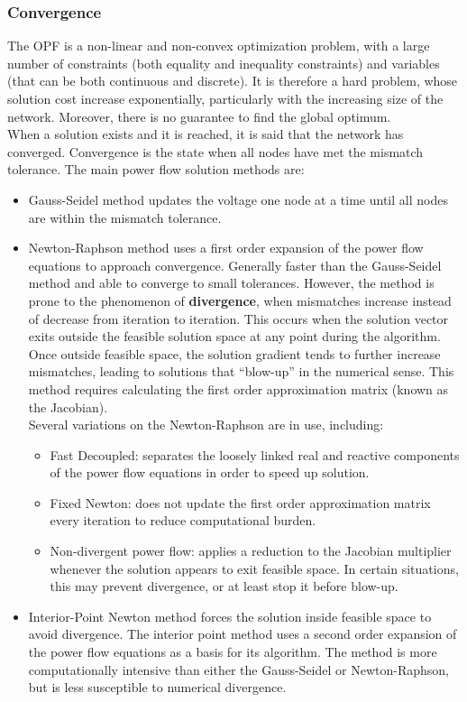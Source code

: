 \subsubsection{Convergence}
The \gls{OPF} is a non-linear and non-convex optimization problem, with a large number of constraints (both equality and inequality constraints) and variables (that can be both continuous and discrete). It is therefore a hard problem, whose solution cost increase exponentially, particularly with the increasing size of the network. Moreover, there is no guarantee to find the global optimum. \\
When a solution exists and it is reached, it is said that the network has converged. Convergence is the state when all nodes have met the mismatch tolerance. The main power flow solution methods are:
\begin{itemize}
    \item Gauss-Seidel method updates the voltage one node at a time until all nodes are within the mismatch tolerance.
    
    \item Newton-Raphson method uses a first order expansion of the power flow equations to approach convergence. Generally faster than the Gauss-Seidel method and able to converge to small tolerances. However, the method is prone to the phenomenon of \textbf{divergence}, when mismatches increase instead of decrease from iteration to iteration. This occurs when the solution vector exits outside the feasible solution space at any point during the algorithm. Once outside feasible space, the solution gradient tends to further increase mismatches, leading to solutions that “blow-up” in the numerical sense. This method requires calculating the first order approximation matrix (known as the Jacobian). \\
    Several variations on the Newton-Raphson are in use, including:
        \begin{itemize}
            \item[] Fast Decoupled: separates the loosely linked real and reactive components of the power flow equations in order to speed up solution.
            \item[] Fixed Newton: does not update the first order approximation matrix every iteration to reduce computational burden.
            \item[] Non-divergent power flow: applies a reduction to the Jacobian multiplier whenever the solution appears to exit feasible space. In certain situations, this may prevent divergence, or at least stop it before blow-up.
        \end{itemize}
    \item Interior-Point Newton method forces the solution inside feasible space to avoid divergence. The interior point method uses a second order expansion of the power flow equations as a basis for its algorithm. The method is more computationally intensive than either the Gauss-Seidel or Newton-Raphson, but is less susceptible to numerical divergence.
\end{itemize}

